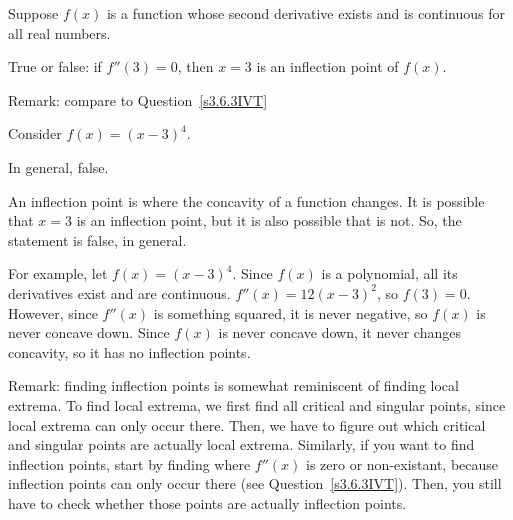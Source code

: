 \begin{question}\label{s3.6.3converse}
Suppose $f(x)$ is a function whose second derivative exists and is continuous for all real numbers.

True or false: if $f''(3)=0$, then $x=3$ is an inflection point of $f(x)$.

Remark: compare to Question~\ref{s3.6.3IVT}
\end{question}
\begin{hint}
Consider $f(x)=(x-3)^4$.
\end{hint}
\begin{answer}
In general, false.
\end{answer}
\begin{solution}
An inflection point is where the concavity of a function changes. It is possible that $x=3$ is an inflection point, but it is also possible that is not. So, the statement is false, in general.

For example, let $f(x)=(x-3)^4$. Since $f(x)$ is a polynomial, all its derivatives exist and are continuous. $f''(x)=12(x-3)^2$, so $f(3)=0$. However, since $f''(x)$ is something squared, it is never negative, so $f(x)$ is never concave down. Since $f(x)$ is never concave down, it never changes concavity, so it has no inflection points.

Remark: finding inflection points is somewhat reminiscent of finding local extrema. To find local extrema, we first find all critical and singular points, since local extrema can only occur there. Then, we have to figure out which critical and singular points are actually local extrema. Similarly, if you want to find inflection points, start by finding where $f''(x)$ is zero or non-existant, because inflection points can only occur there (see Question~\ref{s3.6.3IVT}). Then, you still have to check whether those points are actually inflection points.
\end{solution}
\subsection*{\Procedural}


